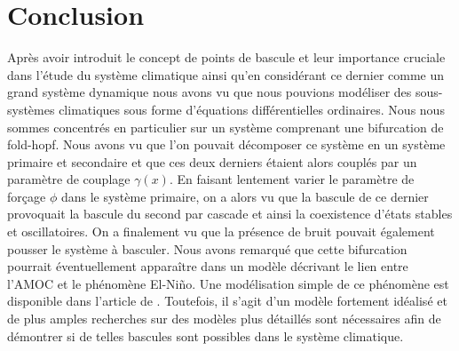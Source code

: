 \section{Conclusion}
Après avoir introduit le concept de points de bascule et leur importance cruciale dans l'étude du système climatique ainsi qu'en considérant ce dernier comme un grand système dynamique nous avons vu que nous pouvions modéliser des sous-systèmes climatiques sous forme d'équations différentielles ordinaires. Nous nous sommes concentrés en particulier sur un système comprenant une bifurcation de fold-hopf. Nous avons vu que l'on pouvait décomposer ce système en un système primaire et secondaire et que ces deux derniers étaient alors couplés par un paramètre de couplage $\gamma(x)$. En faisant lentement varier le paramètre de forçage $\phi$ dans le système primaire, on a alors vu que la bascule de ce dernier provoquait la bascule du second par cascade et ainsi la coexistence d'états stables et oscillatoires. On a finalement vu que la présence de bruit pouvait également pousser le système à basculer. Nous avons remarqué que cette bifurcation pourrait éventuellement apparaître dans un modèle décrivant le lien entre l'AMOC et le phénomène El-Niño. Une modélisation simple de ce phénomène est disponible dans l'article de \cite{dekker_cascading_2018}. Toutefois, il s'agit d'un modèle fortement idéalisé et de plus amples recherches sur des modèles plus détaillés sont nécessaires afin de démontrer si de telles bascules sont possibles dans le système climatique.


